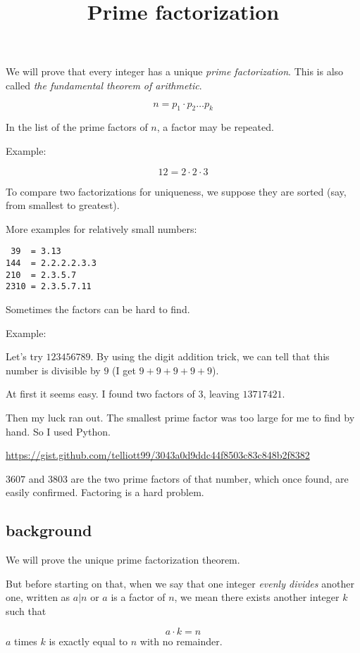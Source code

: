 \documentclass[11pt, oneside]{article}
\title{Prime factorization}
\date{}
\begin{document}
\maketitle
\Large


We will prove that every integer has a unique \emph{prime factorization}.  This is also called \emph{the fundamental theorem of arithmetic}.

\[ n = p_1 \cdot p_2 \dots p_k \]

In the list of the prime factors of $n$, a factor may be repeated.

Example:

\[ 12 = 2 \cdot 2 \cdot 3 \]

To compare two factorizations for uniqueness, we suppose they are sorted (say, from smallest to greatest).

More examples for relatively small numbers:
\begin{verbatim}
 39  = 3.13
144  = 2.2.2.2.3.3
210  = 2.3.5.7
2310 = 2.3.5.7.11
\end{verbatim}

Sometimes the factors can be hard to find.

Example:

Let's try $123456789$.  By using the digit addition trick, we can tell that this number is divisible by $9$ (I get $9 + 9 + 9 + 9 + 9$).

At first it seems easy.  I found two factors of $3$, leaving $13717421$.

Then my luck ran out.  The smallest prime factor was too large for me to find by hand.  So I used Python.

\url{https://gist.github.com/telliott99/3043a0d9ddc44f8503c83c848b2f8382}

$3607$ and $3803$ are the two prime factors of that number, which once found, are easily confirmed.  Factoring is a hard problem.

\subsection*{background}

We will prove the unique prime factorization theorem.

But before starting on that, when we say that one integer \emph{evenly divides} another one, written as $a|n$ or $a$ is a factor of $n$, we mean there exists another integer $k$ such that

\[ a \cdot k = n \]
$a$ times $k$ is exactly equal to $n$ with no remainder.
\end{document}
